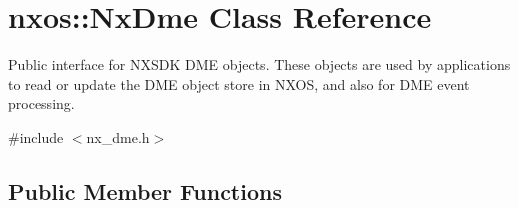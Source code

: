 \hypertarget{classnxos_1_1_nx_dme}{}\section{nxos\+:\+:Nx\+Dme Class Reference}
\label{classnxos_1_1_nx_dme}


Public interface for N\+X\+S\+DK D\+ME objects. These objects are used by applications to read or update the D\+ME object store in N\+X\+OS, and also for D\+ME event processing.  




{\ttfamily \#include $<$nx\+\_\+dme.\+h$>$}

\subsection*{Public Member Functions}
